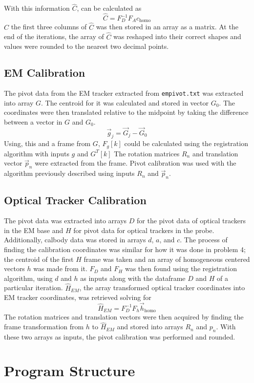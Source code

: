 \documentclass[12pt,letterpaper]{scrartcl}
\begin{document}
    With this information $\hat{C}$, can be calculated as 
    \[\hat{C} = F_D^{-1}F_Ac_\text{homo}\]
    $\hat{C}$ the first three columns of $\hat{C}$ was then stored in an array as a matrix.
    At the end of the iterations, the array of $\hat{C}$ was reshaped into their correct shapes and values were rounded to the nearest two decimal points.
    \subsection{EM Calibration}
    The pivot data from the EM tracker extracted from \texttt{empivot.txt} was extracted into array  $G$.
    The centroid for it was calculated and stored in vector $G_0$.
    The coordinates were then translated relative to the midpoint by taking the difference between a vector in $G$ and $G_0$.
    \[\vec{g}_j = \vec{G}_j - \vec{G}_0\]
    Using, this and a frame from $G$, $F_g[k]$ could be calculated using the registration algorithm with inputs $g$ and $G^T[k]$
    The rotation matrices $R_n$ and translation vector $\vec{p}_n$ were extracted from the frame.
    Pivot calibration was used with the algorithm previously described using inputs $R_n$ and $\vec{p}_n$.
    \subsection{Optical Tracker Calibration}
    The pivot data was extracted into arrays $D$ for the pivot data of optical trackers in the EM base and $H$ for pivot data for optical trackers in the probe.
    Additionally, calbody data was stored in arrays $d$, $a$, and $c$.
    The process of finding the calibration coordinates was similar for how it was done in problem 4; the centroid of the first $H$ frame was taken and an array of homogeneous centered vectors $h$ was made from it.
    $F_D$ and $F_H$ was then found using the registration algorithm, using $d$ and $h$ as inputs along with the dataframe $D$ and $H$ of a particular iteration.
    $\hat{H}_{EM}$, the array transformed optical tracker coordinates into EM tracker coordinates, was retrieved solving for
    \[\hat{H}_{EM} = F_D^{-1}F_h\vec{h}_\text{homo}\]
    The rotation matrices and translation vectors were then acquired by finding the frame transformation from $h$ to $\hat{H}_{EM}$ and stored into arrays $R_n$ and $p_n$.
    With these two arrays as inputs, the pivot calibration was performed and rounded.
    \section{Program Structure}
\end{document}
